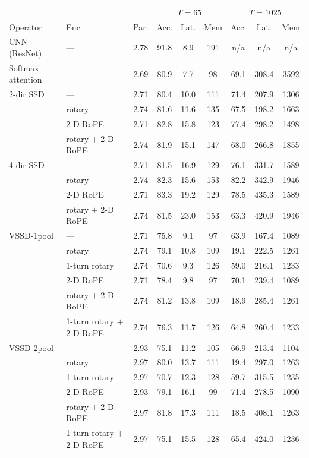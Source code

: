 {\setlength{\tabcolsep}{3pt}
\begin{tabular}{|ll|c|ccc|ccc|}
\hline
 & & & \multicolumn{3}{c|}{$T{=}65$} & \multicolumn{3}{c|}{$T{=}1025$} \\
Operator & Enc. & Par. & Acc. & Lat. & Mem & Acc. & Lat. & Mem \\ \hline
CNN (ResNet) & --- & 2.78 & 91.8 & 8.9 & 191 & n/a & n/a & n/a \\
\hline
Softmax attention & --- & 2.69 & 80.9 & 7.7 & 98 & 69.1 & 308.4 & 3592 \\
\hline
2-dir SSD & --- & 2.71 & 80.4 & 10.0 & 111 & 71.4 & 207.9 & 1306 \\
 & rotary & 2.74 & 81.6 & 11.6 & 135 & 67.5 & 198.2 & 1663 \\
 & 2-D RoPE & 2.71 & 82.8 & 15.8 & 123 & 77.4 & 298.2 & 1498 \\
 & rotary $+$ 2-D RoPE & 2.74 & 81.9 & 15.1 & 147 & 68.0 & 266.8 & 1855 \\
\hline
4-dir SSD & --- & 2.71 & 81.5 & 16.9 & 129 & 76.1 & 331.7 & 1589 \\
 & rotary & 2.74 & 82.3 & 15.6 & 153 & 82.2 & 342.9 & 1946 \\
 & 2-D RoPE & 2.71 & 83.3 & 19.2 & 129 & 78.5 & 435.3 & 1589 \\
 & rotary $+$ 2-D RoPE & 2.74 & 81.5 & 23.0 & 153 & 63.3 & 420.9 & 1946 \\
\hline
VSSD-1pool & --- & 2.71 & 75.8 & 9.1 & 97 & 63.9 & 167.4 & 1089 \\
 & rotary & 2.74 & 79.1 & 10.8 & 109 & 19.1 & 222.5 & 1261 \\
 & 1-turn rotary & 2.74 & 70.6 & 9.3 & 126 & 59.0 & 216.1 & 1233 \\
 & 2-D RoPE & 2.71 & 78.4 & 9.8 & 97 & 70.1 & 239.4 & 1089 \\
 & rotary $+$ 2-D RoPE & 2.74 & 81.2 & 13.8 & 109 & 18.9 & 285.4 & 1261 \\
 & 1-turn rotary $+$ 2-D RoPE & 2.74 & 76.3 & 11.7 & 126 & 64.8 & 260.4 & 1233 \\
\hline
VSSD-2pool & --- & 2.93 & 75.1 & 11.2 & 105 & 66.9 & 213.4 & 1104 \\
 & rotary & 2.97 & 80.0 & 13.7 & 111 & 19.4 & 297.0 & 1263 \\
 & 1-turn rotary & 2.97 & 70.7 & 12.3 & 128 & 59.7 & 315.5 & 1235 \\
 & 2-D RoPE & 2.93 & 79.1 & 16.1 & 99 & 71.4 & 278.5 & 1090 \\
 & rotary $+$ 2-D RoPE & 2.97 & 81.8 & 17.3 & 111 & 18.5 & 408.1 & 1263 \\
 & 1-turn rotary $+$ 2-D RoPE & 2.97 & 75.1 & 15.5 & 128 & 65.4 & 424.0 & 1236 \\
\hline
\end{tabular}}

